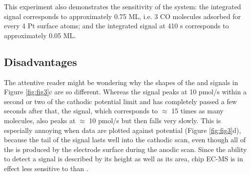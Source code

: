This experiment also demonstrates the sensitivity of the system: the integrated  signal corresponds to approximately 0.75 ML, i.e. 3 CO molecules adsorbed for every 4 Pt surface atoms; and the integrated  signal at 410 s corresponds to approximately 0.05 ML.

\subsection{Disadvantages}\label{subsec:disadvantages}

The attentive reader might be wondering why the shapes of the  and  signals in Figure \ref{fig:fig3}c are so different. Whereas the  signal peaks at 10 pmol/s within a second or two of the cathodic potential limit and has completely passed a few seconds after that, the  signal, which corresponds to $\approx$ 15 times as many molecules, also peaks at $\approx$ 10 pmol/s but then falls very slowly. This is especially annoying when data are plotted against potential (Figure \ref{fig:fig3}d), because the tail of the  signal lasts well into the cathodic scan, even though all of the  is produced by the electrode surface during the anodic scan. Since the ability to detect a signal is described by its height as well as its area, chip EC-MS is in effect less sensitive to  than .

